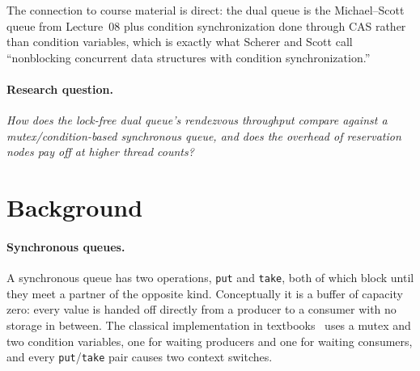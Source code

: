 \documentclass[11pt,a4paper]{article}
\begin{document}
The connection to course material is direct: the dual queue is the
Michael--Scott queue from Lecture~08 plus condition synchronization done
through CAS rather than condition variables, which is exactly what
Scherer and Scott call ``nonblocking concurrent data structures
with condition synchronization.''

\paragraph{Research question.}
\emph{How does the lock-free dual queue's rendezvous throughput compare
against a mutex/condition-based synchronous queue, and does the overhead
of reservation nodes pay off at higher thread counts?}

\section{Background}
\label{sec:background}

\paragraph{Synchronous queues.}
A synchronous queue has two operations, \texttt{put} and \texttt{take},
both of which block until they meet a partner of the opposite kind.
Conceptually it is a buffer of capacity zero: every value is handed off
directly from a producer to a consumer with no storage in between. The
classical implementation in textbooks~\cite[\S10.6.1]{AoMPP} uses a
mutex and two condition variables, one for waiting producers and one
for waiting consumers, and every \texttt{put}/\texttt{take} pair causes
two context switches.
\end{document}
